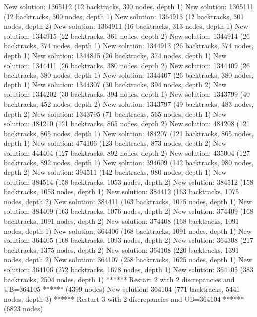 \begin{enumerate}
{\begin{DoxyCode}
New solution: 1365112 (12 backtracks, 300 nodes, depth 1)
New solution: 1365111 (12 backtracks, 300 nodes, depth 1)
New solution: 1364913 (12 backtracks, 301 nodes, depth 2)
New solution: 1364911 (16 backtracks, 313 nodes, depth 1)
New solution: 1344915 (22 backtracks, 361 nodes, depth 2)
New solution: 1344914 (26 backtracks, 374 nodes, depth 1)
New solution: 1344913 (26 backtracks, 374 nodes, depth 1)
New solution: 1344815 (26 backtracks, 374 nodes, depth 1)
New solution: 1344411 (26 backtracks, 380 nodes, depth 2)
New solution: 1344409 (26 backtracks, 380 nodes, depth 1)
New solution: 1344407 (26 backtracks, 380 nodes, depth 1)
New solution: 1344307 (30 backtracks, 394 nodes, depth 2)
New solution: 1344202 (30 backtracks, 394 nodes, depth 1)
New solution: 1343799 (40 backtracks, 452 nodes, depth 2)
New solution: 1343797 (49 backtracks, 483 nodes, depth 2)
New solution: 1343795 (71 backtracks, 565 nodes, depth 1)
New solution: 484210 (121 backtracks, 865 nodes, depth 2)
New solution: 484208 (121 backtracks, 865 nodes, depth 1)
New solution: 484207 (121 backtracks, 865 nodes, depth 1)
New solution: 474106 (123 backtracks, 873 nodes, depth 2)
New solution: 444404 (127 backtracks, 892 nodes, depth 2)
New solution: 435004 (127 backtracks, 892 nodes, depth 1)
New solution: 394609 (142 backtracks, 980 nodes, depth 2)
New solution: 394511 (142 backtracks, 980 nodes, depth 1)
New solution: 384514 (158 backtracks, 1053 nodes, depth 2)
New solution: 384512 (158 backtracks, 1053 nodes, depth 1)
New solution: 384412 (163 backtracks, 1075 nodes, depth 2)
New solution: 384411 (163 backtracks, 1075 nodes, depth 1)
New solution: 384409 (163 backtracks, 1076 nodes, depth 2)
New solution: 374409 (168 backtracks, 1091 nodes, depth 2)
New solution: 374408 (168 backtracks, 1091 nodes, depth 1)
New solution: 364406 (168 backtracks, 1091 nodes, depth 1)
New solution: 364405 (168 backtracks, 1093 nodes, depth 2)
New solution: 364308 (217 backtracks, 1375 nodes, depth 2)
New solution: 364108 (220 backtracks, 1391 nodes, depth 2)
New solution: 364107 (258 backtracks, 1625 nodes, depth 1)
New solution: 364106 (272 backtracks, 1678 nodes, depth 1)
New solution: 364105 (383 backtracks, 2504 nodes, depth 1)
****** Restart 2 with 2 discrepancies and UB=364105 ****** (4399 nodes)
New solution: 364104 (771 backtracks, 5441 nodes, depth 3)
****** Restart 3 with 2 discrepancies and UB=364104 ****** (6823 nodes)


\end{DoxyCode}}
\end{enumerate}
